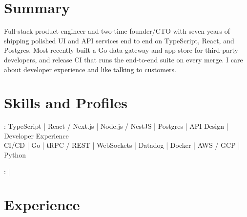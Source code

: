 \documentclass[print]{jack-resume}
\begin{document}
\pagecolor{darkmodeBackground}


\begin{minipage}[t][1cm][t]{.03\textwidth}
    \hfill
\end{minipage}

\section{Summary}
Full-stack product engineer and two-time founder/CTO with seven years of shipping polished UI and API services end to end on TypeScript, React, and Postgres. Most recently built a Go data gateway and app store for third-party developers, and release CI that runs the end-to-end suite on every merge. I care about developer experience and like talking to customers.
\sectionsep

\section{Skills and Profiles}
:
TypeScript \hfill | \hfill
React / Next.js \hfill | \hfill
Node.js / NestJS \hfill | \hfill
Postgres \hfill | \hfill
API Design \hfill | \hfill
Developer Experience \\
\hspace{1.0cm} CI/CD \hfill | \hfill
Go \hfill | \hfill
tRPC / REST \hfill | \hfill
WebSockets \hfill | \hfill
Datadog \hfill | \hfill
Docker \hfill | \hfill
AWS / GCP \hfill | \hfill
Python \\

\raggedright{
    :
      \href{https://www.linkedin.com/in/jack-sturtevant/}{ \ExternalLink} |
     \href{https://github.com/jacksturt}{ \ExternalLink}}

\section{Experience}
\end{document}
